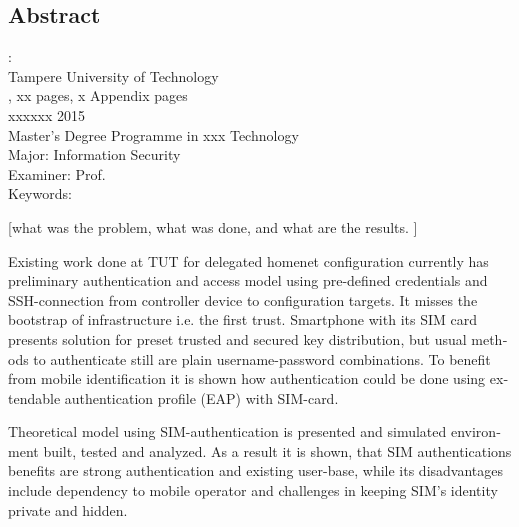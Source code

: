 \documentclass[12pt,a4paper,english]{tutthesis}
\begin{document}
\if@twoside
\clearpage
\fi


\setcounter{page}{0} %

\begin{otherlanguage}{english} %
\chapter*{Abstract}

\begin{spacing}{1.0}
  {\bf \textsf{\MakeUppercase{\@author}}}: \@title\\   %
   \textsf{Tampere University of Technology}\\
   \textsf{\@thesistype, xx pages, x Appendix pages} \\
   \textsf{xxxxxx 2015}\\
   \textsf{Master's Degree Programme in xxx Technology}\\
   \textsf{Major: Information Security}\\
   \textsf{Examiner: Prof. \@examiner}\\ %
   \textsf{Keywords: }\\
\end{spacing}

[what was the problem, what was done, and what are the results. ]

Existing work done at TUT for delegated homenet configuration
currently has preliminary authentication and access model using
pre-defined credentials and SSH-connection from 
controller device to configuration targets. It misses the bootstrap of 
infrastructure i.e. the first trust. 
Smartphone with its SIM card presents solution for preset trusted and secured 
key distribution, but 
usual methods to authenticate still are plain username-password combinations.  
To benefit from mobile identification it is shown how authentication could be done
using extendable authentication profile (EAP) with SIM-card. 


Theoretical model using SIM-authentication is presented and simulated environment
built, tested and analyzed.
As a result it is shown, that SIM authentications benefits are strong
authentication and existing user-base, while its disadvantages include
dependency to mobile operator and challenges in keeping SIM's identity private and hidden.


\end{otherlanguage}
\end{document}
